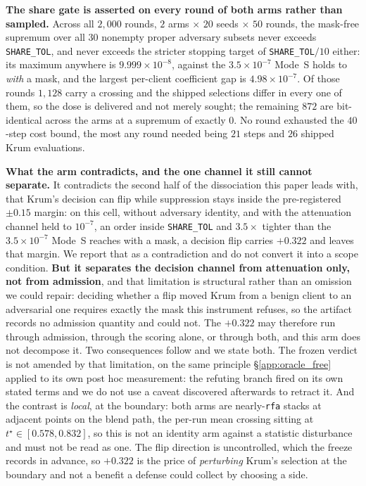\documentclass{article}
\begin{document}
\textbf{The share gate is asserted on every round of both arms rather than sampled.} Across all $2{,}000$ rounds, $2$ arms $\times$ $20$ seeds $\times$ $50$ rounds, the mask-free supremum over all $30$ nonempty proper adversary subsets never exceeds \texttt{SHARE\_TOL}, and never exceeds the stricter stopping target of \texttt{SHARE\_TOL}$/10$ either: its maximum anywhere is $9.999{\times}10^{-8}$, against the $3.5{\times}10^{-7}$ Mode~S holds to \emph{with} a mask, and the largest per-client coefficient gap is $4.98{\times}10^{-7}$. Of those rounds $1{,}128$ carry a crossing and the shipped selections differ in every one of them, so the dose is delivered and not merely sought; the remaining $872$ are bit-identical across the arms at a supremum of exactly $0$. No round exhausted the $40$-step cost bound, the most any round needed being $21$ steps and $26$ shipped Krum evaluations.

\textbf{What the arm contradicts, and the one channel it still cannot separate.} It contradicts the second half of the dissociation this paper leads with, that Krum's decision can flip while suppression stays inside the pre-registered $\pm0.15$ margin: on this cell, without adversary identity, and with the attenuation channel held to $10^{-7}$, an order inside \texttt{SHARE\_TOL} and $3.5{\times}$ tighter than the $3.5{\times}10^{-7}$ Mode~S reaches with a mask, a decision flip carries $+0.322$ and leaves that margin. We report that as a contradiction and do not convert it into a scope condition. \textbf{But it separates the decision channel from attenuation only, not from admission}, and that limitation is structural rather than an omission we could repair: deciding whether a flip moved Krum from a benign client to an adversarial one requires exactly the mask this instrument refuses, so the artifact records no admission quantity and could not. The $+0.322$ may therefore run through admission, through the scoring alone, or through both, and this arm does not decompose it. Two consequences follow and we state both. The frozen verdict is not amended by that limitation, on the same principle §\ref{app:oracle_free} applied to its own post hoc measurement: the refuting branch fired on its own stated terms and we do not use a caveat discovered afterwards to retract it. And the contrast is \emph{local}, at the boundary: both arms are nearly-\texttt{rfa} stacks at adjacent points on the blend path, the per-run mean crossing sitting at $t^\star \in [0.578, 0.832]$, so this is not an identity arm against a statistic disturbance and must not be read as one. The flip direction is uncontrolled, which the freeze records in advance, so $+0.322$ is the price of \emph{perturbing} Krum's selection at the boundary and not a benefit a defense could collect by choosing a side.
\end{document}
